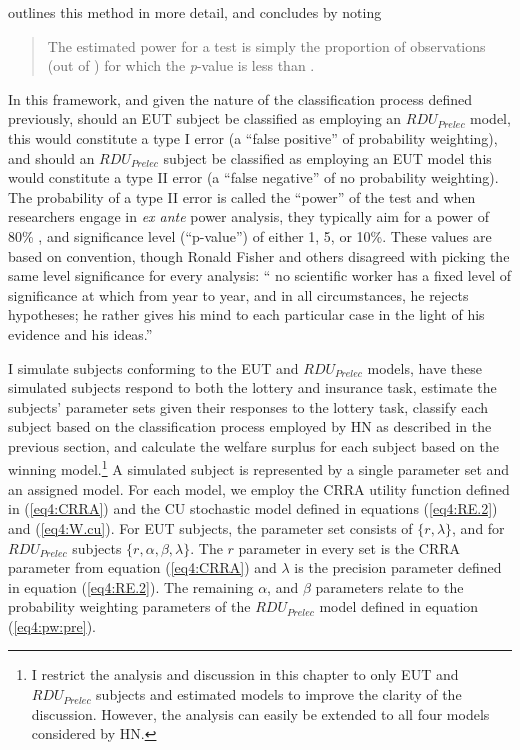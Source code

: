 \documentclass[../main.tex]{subfiles}
\begin{document}
\textcite[109]{Feiveson2002} outlines this method in more detail, and concludes by noting 
\blockquote{
	The estimated power for a  test is simply the proportion of observations (out of ) for which the \textit{p}-value is less than .
}

In this framework, and given the nature of the classification process defined previously, should an EUT subject be classified as employing an $\mathit{RDU_{Prelec}}$ model, this would constitute a type I error (a \enquote{false positive} of probability weighting), and should an $\mathit{RDU_{Prelec}}$ subject be classified as employing an EUT model this would constitute a type II error (a \enquote{false negative} of no probability weighting).
The probability of a type II error is called the \enquote{power} of the test and when researchers engage in \textit{ex ante} power analysis, they typically aim for a power of 80\% \parencite{Cohen1988, Gelman2014}, and significance level (\enquote{p-value}) of either 1, 5, or 10\%.
These values are based on convention, though Ronald Fisher and others disagreed with picking the same level significance for every analysis: \enquote{\textelp{} no scientific worker has a fixed level of significance at which from year to year, and in all circumstances, he rejects hypotheses; he rather gives his mind to each particular case in the light of his evidence and his ideas.} \parencite{Fisher1956}

I simulate subjects conforming to the EUT and $\mathit{RDU_{Prelec}}$ models, have these simulated subjects respond to both the lottery and insurance task, estimate the subjects' parameter sets given their responses to the lottery task, classify each subject based on the classification process employed by HN as described in the previous section, and calculate the welfare surplus for each subject based on the winning model.\footnote{
	I restrict the analysis and discussion in this chapter to only EUT and $\mathit{RDU_{Prelec}}$ subjects and estimated models to improve the clarity of the discussion.
	However, the analysis can easily be extended to all four models considered by HN.
}
A simulated subject is represented by a single parameter set and an assigned model.
For each model, we employ the CRRA utility function defined in (\ref{eq4:CRRA}) and the CU stochastic model defined in equations (\ref{eq4:RE.2}) and (\ref{eq4:W.cu}).
For EUT subjects, the parameter set consists of $\lbrace r, \lambda \rbrace$, and for $\mathit{RDU_{Prelec}}$ subjects $\lbrace r, \alpha, \beta, \lambda \rbrace$.
The $r$ parameter in every set is the CRRA parameter from equation (\ref{eq4:CRRA}) and $\lambda$ is the precision parameter defined in equation (\ref{eq4:RE.2}).
The remaining $\alpha$, and $\beta$ parameters relate to the probability weighting parameters of the $\mathit{RDU_{Prelec}}$ model defined in equation (\ref{eq4:pw:pre}).
\end{document}
